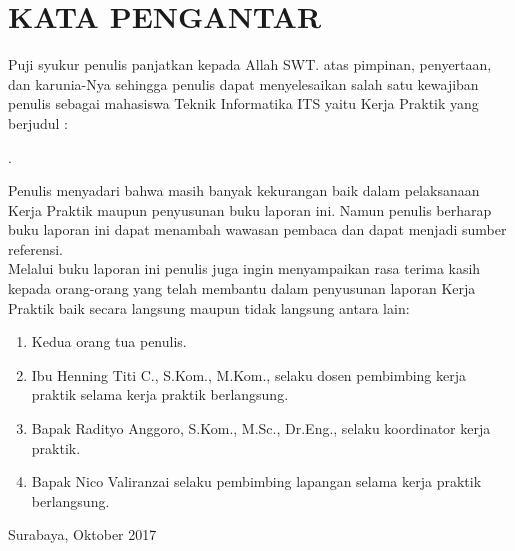 \chapter{KATA PENGANTAR}

\indent\indent Puji syukur penulis panjatkan kepada Allah SWT. atas pimpinan, penyertaan, dan karunia-Nya sehingga penulis dapat menyelesaikan salah satu kewajiban penulis sebagai mahasiswa Teknik Informatika ITS yaitu Kerja Praktik yang berjudul :
\begin{center}
	\textbf{\MakeUppercase{\judul}}.
\end{center}

Penulis menyadari bahwa masih banyak kekurangan baik dalam pelaksanaan Kerja Praktik maupun penyusunan buku laporan ini. Namun penulis berharap buku laporan ini dapat menambah wawasan pembaca dan dapat menjadi sumber referensi.\\
Melalui buku laporan ini penulis juga ingin menyampaikan rasa terima kasih kepada orang-orang yang telah membantu dalam penyusunan laporan Kerja Praktik baik secara langsung maupun tidak langsung antara lain:
\begin{enumerate}
\item Kedua orang tua penulis.
\item Ibu Henning Titi C., S.Kom., M.Kom., selaku dosen pembimbing kerja praktik selama kerja praktik berlangsung.
\item Bapak Radityo Anggoro, S.Kom., M.Sc., Dr.Eng., selaku koordinator kerja praktik.
\item Bapak Nico Valiranzai selaku pembimbing lapangan selama kerja praktik berlangsung.
\end{enumerate}

\hfill Surabaya, Oktober 2017 \\ 

\begin{flushright}
\hfill{\penulis} 
\end{flushright}
\cleardoublepage

